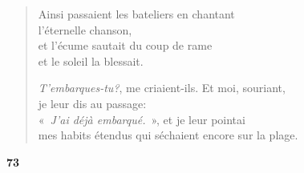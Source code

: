 \documentclass[a4paper,12pt]{book}
\begin{document}
\begin{verse}
  Ainsi passaient les bateliers en chantant \\
  l'éternelle chanson, \\
  et l'écume sautait du coup de rame \\
  et le soleil la blessait.

  \emph{T'embarques-tu?}, me criaient-ils. Et moi, souriant, \\
  je leur dis au passage: \\
  «~\emph{J'ai déjà embarqué.}~», et je leur pointai \\
  mes habits étendus qui séchaient encore sur la plage.
\end{verse}

\bigskip

\begin{center}
  \textbf{73}
\end{center}

\settowidth{\versewidth}{D'une horloge on entendait}
\end{document}
